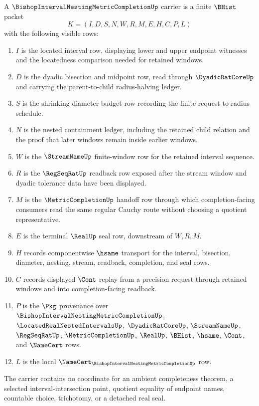 \begin{definition}
\label{def:bishop-interval-nesting-metric-completion-carrier}
A $\BishopIntervalNestingMetricCompletionUp$ carrier is a finite $\BHist$ packet
$$
K=(I,D,S,N,W,R,M,E,H,C,P,L)
$$
with the following visible rows:
\begin{enumerate}
\item $I$ is the located interval row, displaying lower and upper endpoint witnesses and the locatedness comparison needed for retained windows.
\item $D$ is the dyadic bisection and midpoint row, read through $\DyadicRatCoreUp$ and carrying the parent-to-child radius-halving ledger.
\item $S$ is the shrinking-diameter budget row recording the finite request-to-radius schedule.
\item $N$ is the nested containment ledger, including the retained child relation and the proof that later windows remain inside earlier windows.
\item $W$ is the $\StreamNameUp$ finite-window row for the retained interval sequence.
\item $R$ is the $\RegSeqRatUp$ readback row exposed after the stream window and dyadic tolerance data have been displayed.
\item $M$ is the $\MetricCompletionUp$ handoff row through which completion-facing consumers read the same regular Cauchy route without choosing a quotient representative.
\item $E$ is the terminal $\RealUp$ seal row, downstream of $W,R,M$.
\item $H$ records componentwise $\hsame$ transport for the interval, bisection, diameter, nesting, stream, readback, completion, and seal rows.
\item $C$ records displayed $\Cont$ replay from a precision request through retained windows and into completion-facing readback.
\item $P$ is the $\Pkg$ provenance over $\BishopIntervalNestingMetricCompletionUp$, $\LocatedRealNestedIntervalsUp$, $\DyadicRatCoreUp$, $\StreamNameUp$, $\RegSeqRatUp$, $\MetricCompletionUp$, $\RealUp$, $\BHist$, $\hsame$, $\Cont$, and $\NameCert$ rows.
\item $L$ is the local $\NameCert_{\BishopIntervalNestingMetricCompletionUp}$ row.
\end{enumerate}
The carrier contains no coordinate for an ambient completeness theorem, a selected interval-intersection point, quotient equality of endpoint names, countable choice, trichotomy, or a detached real seal.
\end{definition}

